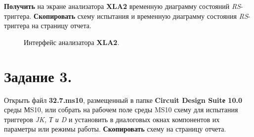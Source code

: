 \documentclass[bachelor, och, otchet, hidelinks]{SCWorks}
\begin{document}
\textbf{Получить} на экране анализатора \textbf{XLA2} временную диаграмму состояний \textit{RS}-триггера. 
\textbf{Скопировать} схему испытания и временную диаграмму состояния \textit{RS}-триггера на страницу отчета.

\begin{figure}[h]
	\caption{Интерфейс анализатора \textbf{XLA2}.}
\end{figure}

\newpage

\section*{Задание 3.}

Открыть файл \textbf{32.7.ms10}, размещенный в папке \textbf{Circuit Design Suitе 10.0} среды МS10, или собрать 
на рабочем поле среды MS10 схему для испытания триггеров \textit{JK, Т и D} и установить в диалоговых окнах 
компонентов их параметры или режимы работы. \textbf{Скопировать} схему на страницу отчета.
\end{document}
